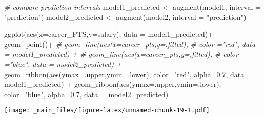 \documentclass[
]{book}
\newenvironment{Shaded}{\begin{snugshade}}{\end{snugshade}}
\newcommand{\AttributeTok}[1]{\textcolor[rgb]{0.77,0.63,0.00}{#1}}
\newcommand{\AttributeTok}[1]{\textcolor[rgb]{0.13,0.29,0.53}{#1}}
\newcommand{\CommentTok}[1]{\textcolor[rgb]{0.56,0.35,0.01}{\textit{#1}}}
\newcommand{\FloatTok}[1]{\textcolor[rgb]{0.00,0.00,0.81}{#1}}
\newcommand{\FunctionTok}[1]{\textcolor[rgb]{0.00,0.00,0.00}{#1}}
\newcommand{\FunctionTok}[1]{\textcolor[rgb]{0.13,0.29,0.53}{\textbf{#1}}}
\newcommand{\NormalTok}[1]{#1}
\newcommand{\OtherTok}[1]{\textcolor[rgb]{0.56,0.35,0.01}{#1}}
\newcommand{\SpecialCharTok}[1]{\textcolor[rgb]{0.00,0.00,0.00}{#1}}
\newcommand{\SpecialCharTok}[1]{\textcolor[rgb]{0.81,0.36,0.00}{\textbf{#1}}}
\newcommand{\StringTok}[1]{\textcolor[rgb]{0.31,0.60,0.02}{#1}}
\begin{document}
\begin{Shaded}
\begin{Highlighting}[]
\CommentTok{\# compare prediction intervals}
\NormalTok{model1\_predicted }\OtherTok{\textless{}{-}} \FunctionTok{augment}\NormalTok{(model1, }\AttributeTok{interval =} \StringTok{"prediction"}\NormalTok{)}
\NormalTok{model2\_predicted }\OtherTok{\textless{}{-}} \FunctionTok{augment}\NormalTok{(model2, }\AttributeTok{interval =} \StringTok{"prediction"}\NormalTok{)}

  \FunctionTok{ggplot}\NormalTok{(}\FunctionTok{aes}\NormalTok{(}\AttributeTok{x=}\NormalTok{career\_PTS,}\AttributeTok{y=}\NormalTok{salary), }\AttributeTok{data =}\NormalTok{ model1\_predicted)}\SpecialCharTok{+}
  \FunctionTok{geom\_point}\NormalTok{()}\SpecialCharTok{+}
  \CommentTok{\# geom\_line(aes(x=career\_pts,y=.fitted),}
  \CommentTok{\#           color ="red", data = model1\_predicted) +}
  \CommentTok{\# geom\_line(aes(x=career\_pts,y=.fitted),}
  \CommentTok{\#          color ="blue", data = model2\_predicted) +}
  \FunctionTok{geom\_ribbon}\NormalTok{(}\FunctionTok{aes}\NormalTok{(}\AttributeTok{ymax=}\NormalTok{.upper,}\AttributeTok{ymin=}\NormalTok{.lower),}
              \AttributeTok{color=}\StringTok{"red"}\NormalTok{,}
              \AttributeTok{alpha=}\FloatTok{0.7}\NormalTok{,}
              \AttributeTok{data =}\NormalTok{ model1\_predicted) }\SpecialCharTok{+}
  \FunctionTok{geom\_ribbon}\NormalTok{(}\FunctionTok{aes}\NormalTok{(}\AttributeTok{ymax=}\NormalTok{.upper,}\AttributeTok{ymin=}\NormalTok{.lower),}
              \AttributeTok{color=}\StringTok{"blue"}\NormalTok{,}
              \AttributeTok{alpha=}\FloatTok{0.7}\NormalTok{,}
              \AttributeTok{data =}\NormalTok{ model2\_predicted)}
\end{Highlighting}
\end{Shaded}

\texttt{[image: \_main\_files/figure-latex/unnamed-chunk-19-1.pdf]}

\begin{Shaded}
\end{Shaded}
\end{document}
